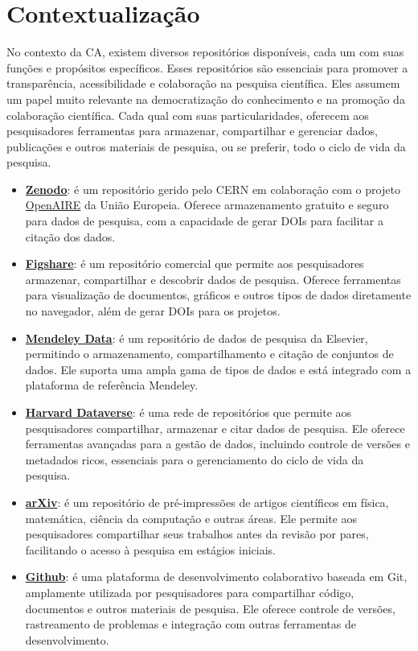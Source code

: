 \documentclass[
  a4paper,
]{book}
\providecommand{\tightlist}{%
  \setlength{\itemsep}{0pt}\setlength{\parskip}{0pt}}\usepackage{longtable,booktabs,array}
\begin{document}
\section{Contextualização}\label{contextualizauxe7uxe3o-1}

No contexto da CA, existem diversos repositórios disponíveis, cada um
com suas funções e propósitos específicos. Esses repositórios são
essenciais para promover a transparência, acessibilidade e colaboração
na pesquisa científica. Eles assumem um papel muito relevante na
democratização do conhecimento e na promoção da colaboração científica.
Cada qual com suas particularidades, oferecem aos pesquisadores
ferramentas para armazenar, compartilhar e gerenciar dados, publicações
e outros materiais de pesquisa, ou se preferir, todo o ciclo de vida da
pesquisa.

\begin{itemize}
\tightlist
\item
  \href{https://www.zenodo.org}{\textbf{Zenodo}}: é um repositório
  gerido pelo CERN em colaboração com o projeto
  \href{https://www.openaire.eu/}{OpenAIRE} da União Europeia. Oferece
  armazenamento gratuito e seguro para dados de pesquisa, com a
  capacidade de gerar DOIs para facilitar a citação dos dados.
\item
  \href{https://www.figshare.com}{\textbf{Figshare}}: é um repositório
  comercial que permite aos pesquisadores armazenar, compartilhar e
  descobrir dados de pesquisa. Oferece ferramentas para visualização de
  documentos, gráficos e outros tipos de dados diretamente no navegador,
  além de gerar DOIs para os projetos.
\item
  \href{https://data.mendeley.com}{\textbf{Mendeley Data}}: é um
  repositório de dados de pesquisa da Elsevier, permitindo o
  armazenamento, compartilhamento e citação de conjuntos de dados. Ele
  suporta uma ampla gama de tipos de dados e está integrado com a
  plataforma de referência Mendeley.
\item
  \href{https://dataverse.harvard.edu}{\textbf{Harvard Dataverse}}: é
  uma rede de repositórios que permite aos pesquisadores compartilhar,
  armazenar e citar dados de pesquisa. Ele oferece ferramentas avançadas
  para a gestão de dados, incluindo controle de versões e metadados
  ricos, essenciais para o gerenciamento do ciclo de vida da pesquisa.
\item
  \href{https://arxiv.org}{\textbf{arXiv}}: é um repositório de
  pré-impressões de artigos científicos em física, matemática, ciência
  da computação e outras áreas. Ele permite aos pesquisadores
  compartilhar seus trabalhos antes da revisão por pares, facilitando o
  acesso à pesquisa em estágios iniciais.
\item
  \href{https://github.com}{\textbf{Github}}: é uma plataforma de
  desenvolvimento colaborativo baseada em Git, amplamente utilizada por
  pesquisadores para compartilhar código, documentos e outros materiais
  de pesquisa. Ele oferece controle de versões, rastreamento de
  problemas e integração com outras ferramentas de desenvolvimento.
\end{itemize}
\end{document}
